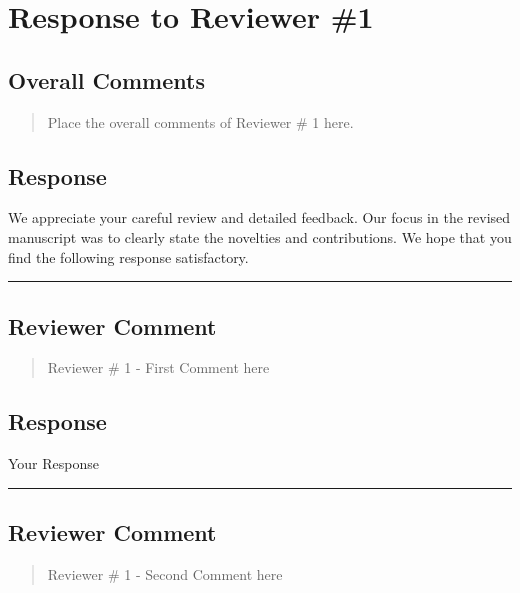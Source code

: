 \section{Response to Reviewer \#1}
\subsection*{Overall Comments}
\begin{mdframed}
\begin{quote}
Place the overall comments of Reviewer \# 1 here.
\end{quote}
\end{mdframed}

\subsection{Response} 
We appreciate your careful review and detailed feedback. Our focus in the revised manuscript was to clearly state the novelties and contributions. We hope that you find the following response satisfactory.


\noindent\rule{17cm}{2.0pt}

\subsection{Reviewer Comment}
\begin{mdframed}
\begin{quote}
	Reviewer \# 1 - First Comment here
\end{quote}
\end{mdframed}

\subsection{Response} 
Your Response

\noindent\rule{17cm}{2.0pt}



\subsection{Reviewer Comment}
\begin{mdframed}
\begin{quote}
	Reviewer \# 1 - Second Comment here
\end{quote}
\end{mdframed}

